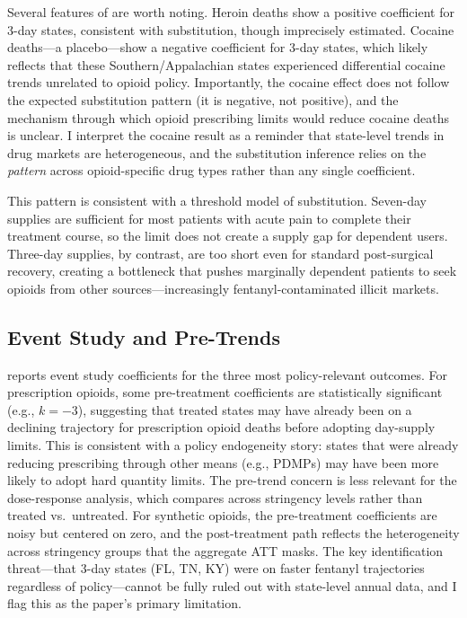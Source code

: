 \documentclass[12pt]{article}
\begin{document}
Several features of  are worth noting. Heroin deaths show a positive coefficient for 3-day states, consistent with substitution, though imprecisely estimated. Cocaine deaths---a placebo---show a negative coefficient for 3-day states, which likely reflects that these Southern/Appalachian states experienced differential cocaine trends unrelated to opioid policy. Importantly, the cocaine effect does not follow the expected substitution pattern (it is negative, not positive), and the mechanism through which opioid prescribing limits would reduce cocaine deaths is unclear. I interpret the cocaine result as a reminder that state-level trends in drug markets are heterogeneous, and the substitution inference relies on the \textit{pattern} across opioid-specific drug types rather than any single coefficient.

This pattern is consistent with a threshold model of substitution. Seven-day supplies are sufficient for most patients with acute pain to complete their treatment course, so the limit does not create a supply gap for dependent users. Three-day supplies, by contrast, are too short even for standard post-surgical recovery, creating a bottleneck that pushes marginally dependent patients to seek opioids from other sources---increasingly fentanyl-contaminated illicit markets.

\subsection{Event Study and Pre-Trends}



 reports event study coefficients for the three most policy-relevant outcomes. For prescription opioids, some pre-treatment coefficients are statistically significant (e.g., $k=-3$), suggesting that treated states may have already been on a declining trajectory for prescription opioid deaths before adopting day-supply limits. This is consistent with a policy endogeneity story: states that were already reducing prescribing through other means (e.g., PDMPs) may have been more likely to adopt hard quantity limits. The pre-trend concern is less relevant for the dose-response analysis, which compares across stringency levels rather than treated vs.\ untreated. For synthetic opioids, the pre-treatment coefficients are noisy but centered on zero, and the post-treatment path reflects the heterogeneity across stringency groups that the aggregate ATT masks. The key identification threat---that 3-day states (FL, TN, KY) were on faster fentanyl trajectories regardless of policy---cannot be fully ruled out with state-level annual data, and I flag this as the paper's primary limitation.
\end{document}
